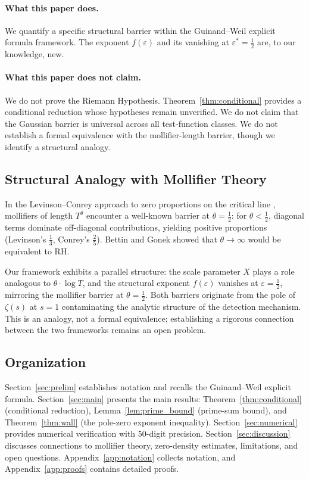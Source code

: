 \documentclass[12pt]{article}
\theoremstyle{remark}
\begin{document}
\paragraph{What this paper does.}
We quantify a specific structural barrier within the Guinand--Weil explicit
formula framework. The exponent $f(\varepsilon)$ and its vanishing at
$\varepsilon^* = \tfrac{1}{2}$ are, to our knowledge, new.

\paragraph{What this paper does not claim.}
We do not prove the Riemann Hypothesis. Theorem~\ref{thm:conditional}
provides a conditional reduction whose hypotheses remain unverified. We do
not claim that the Gaussian barrier is universal across all test-function
classes. We do not establish a formal equivalence with the mollifier-length
barrier, though we identify a structural analogy.

\subsection{Structural Analogy with Mollifier Theory}

In the Levinson--Conrey approach to zero proportions on the critical line
\cite{Levinson1974,Conrey1989}, mollifiers of length $T^\theta$ encounter
a well-known barrier at $\theta = \tfrac{1}{2}$: for $\theta < \tfrac{1}{2}$,
diagonal terms dominate off-diagonal contributions, yielding positive
proportions (Levinson's $\tfrac{1}{3}$, Conrey's $\tfrac{2}{5}$). Bettin and
Gonek \cite{BettinGonek2016} showed that $\theta \to \infty$ would be
equivalent to RH.

Our framework exhibits a parallel structure: the scale parameter $X$
plays a role analogous to $\theta \cdot \log T$, and the structural exponent
$f(\varepsilon)$ vanishes at $\varepsilon = \tfrac{1}{2}$, mirroring the
mollifier barrier at $\theta = \tfrac{1}{2}$. Both barriers originate from
the pole of $\zeta(s)$ at $s=1$ contaminating the analytic structure of the
detection mechanism. This is an analogy, not a formal equivalence; establishing
a rigorous connection between the two frameworks remains an open problem.

\subsection{Organization}

Section~\ref{sec:prelim} establishes notation and recalls the Guinand--Weil
explicit formula. Section~\ref{sec:main} presents the main results:
Theorem~\ref{thm:conditional} (conditional reduction),
Lemma~\ref{lem:prime_bound} (prime-sum bound),
and Theorem~\ref{thm:wall} (the pole-zero exponent inequality).
Section~\ref{sec:numerical} provides numerical verification with 50-digit
precision. Section~\ref{sec:discussion} discusses connections to mollifier
theory, zero-density estimates, limitations, and open questions.
Appendix~\ref{app:notation} collects notation, and
Appendix~\ref{app:proofs} contains detailed proofs.
\end{document}
